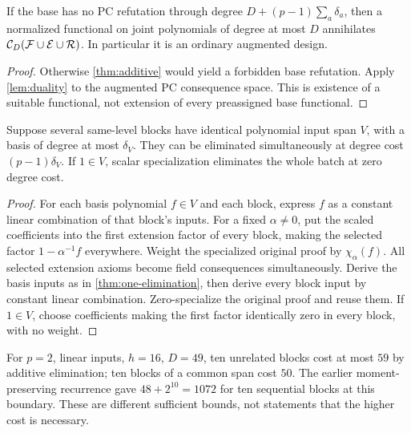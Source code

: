 \begin{corollary}\label{cor:pcdesign}
If the base has no PC refutation through degree $D+(p-1)\sum_a\delta_a$, then a normalized functional on joint polynomials of degree at most $D$ annihilates $\mathcal C_{D}(\mathcal F\cup\mathcal E\cup\mathcal R)$. In particular it is an ordinary augmented design.
\end{corollary}
\begin{proof}
Otherwise \cref{thm:additive} would yield a forbidden base refutation. Apply \cref{lem:duality} to the augmented PC consequence space. This is existence of a suitable functional, not extension of every preassigned base functional.
\end{proof}

\begin{lemma}\label{lem:equalspan}
Suppose several same-level blocks have identical polynomial input span $V$, with a basis of degree at most $\delta_V$. They can be eliminated simultaneously at degree cost $(p-1)\delta_V$. If $1\in V$, scalar specialization eliminates the whole batch at zero degree cost.
\end{lemma}
\begin{proof}
For each basis polynomial $f\in V$ and each block, express $f$ as a constant linear combination of that block's inputs. For a fixed $\alpha\ne0$, put the scaled coefficients into the first extension factor of every block, making the selected factor $1-\alpha^{-1}f$ everywhere. Weight the specialized original proof by $\chi_\alpha(f)$. All selected extension axioms become field consequences simultaneously. Derive the basis inputs as in \cref{thm:one-elimination}, then derive every block input by constant linear combination. Zero-specialize the original proof and reuse them. If $1\in V$, choose coefficients making the first factor identically zero in every block, with no weight.
\end{proof}

\begin{remark}
For $p=2$, linear inputs, $h=16$, $D=49$, ten unrelated blocks cost at most $59$ by additive elimination; ten blocks of a common span cost $50$. The earlier moment-preserving recurrence gave $48+2^{10}=1072$ for ten sequential blocks at this boundary. These are different sufficient bounds, not statements that the higher cost is necessary.
\end{remark}

